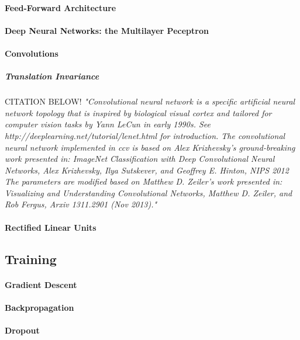 \documentclass[a4paper,11pt]{article}
\begin{document}
\paragraph{Feed-Forward Architecture}

\paragraph{Deep Neural Networks: the Multilayer Peceptron}

\paragraph{Convolutions}

\subparagraph{Translation Invariance}

CITATION BELOW!
\it{"Convolutional neural network is a specific artificial neural network topology that is inspired by biological visual cortex and tailored for computer vision tasks by Yann LeCun in early 1990s. See http://deeplearning.net/tutorial/lenet.html for introduction.
The convolutional neural network implemented in ccv is based on Alex Krizhevsky’s ground-breaking work presented in:
ImageNet Classification with Deep Convolutional Neural Networks, Alex Krizhevsky, Ilya Sutskever, and Geoffrey E. Hinton, NIPS 2012
The parameters are modified based on Matthew D. Zeiler’s work presented in:
Visualizing and Understanding Convolutional Networks, Matthew D. Zeiler, and Rob Fergus, Arxiv 1311.2901 (Nov 2013)."}

\paragraph{Rectified Linear Units}



\subsection{Training}
\paragraph{Gradient Descent}
\paragraph{Backpropagation}
\paragraph{Dropout}
\end{document}
